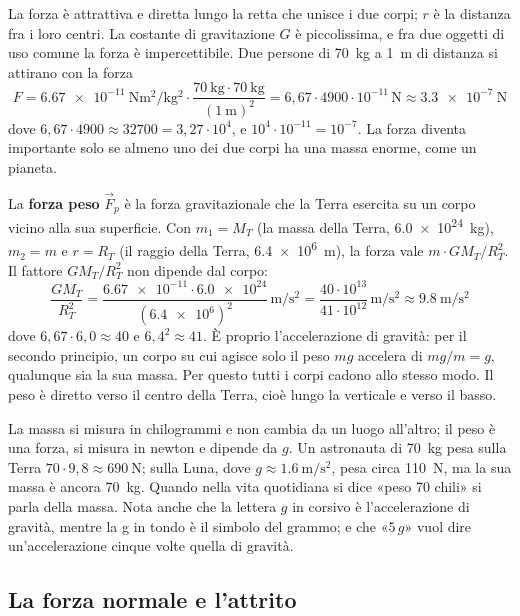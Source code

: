 La forza è attrattiva e diretta lungo la retta che unisce i due corpi; $r$ è la distanza fra i loro centri. La costante di gravitazione $G$ è piccolissima, e fra due oggetti di uso comune la forza è impercettibile. Due persone di \SI{70}{\kilo\gram} a \SI{1}{\metre} di distanza si attirano con la forza
\[
  F = \SI{6,67e-11}{\newton\metre\squared\per\kilo\gram\squared} \cdot \frac{\SI{70}{\kilo\gram} \cdot \SI{70}{\kilo\gram}}{(\SI{1}{\metre})^2} = 6{,}67 \cdot 4900 \cdot 10^{-11}\,\si{\newton} \approx \SI{3,3e-7}{\newton}
\]
dove $6{,}67 \cdot 4900 \approx \num{32700} = 3{,}27 \cdot 10^{4}$, e $10^{4} \cdot 10^{-11} = 10^{-7}$. La forza diventa importante solo se almeno uno dei due corpi ha una massa enorme, come un pianeta.

La \textbf{forza peso} $\vec F_p$ è la forza gravitazionale che la Terra esercita su un corpo vicino alla sua superficie. Con $m_1 = M_T$ (la massa della Terra, \SI{6,0e24}{\kilo\gram}), $m_2 = m$ e $r = R_T$ (il raggio della Terra, \SI{6,4e6}{\metre}), la forza vale $m \cdot G M_T/R_T^2$. Il fattore $G M_T/R_T^2$ non dipende dal corpo:
\[
  \frac{G M_T}{R_T^2} = \frac{\num{6,67e-11} \cdot \num{6,0e24}}{(\num{6,4e6})^2}\,\si{\metre\per\second\squared} = \frac{40 \cdot 10^{13}}{41 \cdot 10^{12}}\,\si{\metre\per\second\squared} \approx \SI{9,8}{\metre\per\second\squared}
\]
dove $6{,}67 \cdot 6{,}0 \approx 40$ e $6{,}4^2 \approx 41$. È proprio l'accelerazione di gravità: per il secondo principio, un corpo su cui agisce solo il peso $mg$ accelera di $mg/m = g$, qualunque sia la sua massa. Per questo tutti i corpi cadono allo stesso modo. Il peso è diretto verso il centro della Terra, cioè lungo la verticale e verso il basso.

\begin{attenzione}
La massa si misura in chilogrammi e non cambia da un luogo all'altro; il peso è una forza, si misura in newton e dipende da $g$. Un astronauta di \SI{70}{\kilo\gram} pesa sulla Terra $70 \cdot 9{,}8 \approx \SI{690}{\newton}$; sulla Luna, dove $g \approx \SI{1,6}{\metre\per\second\squared}$, pesa circa \SI{110}{\newton}, ma la sua massa è ancora \SI{70}{\kilo\gram}. Quando nella vita quotidiana si dice «peso 70 chili» si parla della massa. Nota anche che la lettera $g$ in corsivo è l'accelerazione di gravità, mentre la g in tondo è il simbolo del grammo; e che «$5\,g$» vuol dire un'accelerazione cinque volte quella di gravità.
\end{attenzione}

\subsection{La forza normale e l'attrito}

